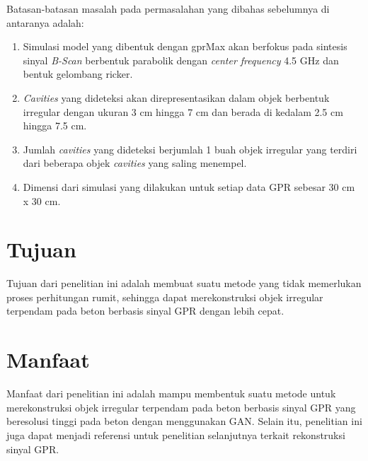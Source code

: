 Batasan-batasan masalah pada permasalahan yang dibahas sebelumnya di antaranya adalah:

\begin{enumerate}[nolistsep]

  \item Simulasi model yang dibentuk dengan gprMax akan berfokus pada sintesis sinyal \emph{B-Scan} berbentuk parabolik dengan \emph{center frequency} 4.5 GHz dan bentuk gelombang ricker.

  \item \emph{Cavities} yang dideteksi akan direpresentasikan dalam objek berbentuk irregular dengan ukuran 3 cm hingga 7 cm dan berada di kedalam 2.5 cm hingga 7.5 cm.
  
  \item Jumlah \emph{cavities} yang dideteksi berjumlah 1 buah objek irregular yang terdiri dari beberapa objek \emph{cavities} yang saling menempel.

  \item Dimensi dari simulasi yang dilakukan untuk setiap data GPR sebesar 30 cm x 30 cm.

\end{enumerate}

\section{Tujuan}
\label{sec:Tujuan}

Tujuan dari penelitian ini adalah membuat suatu metode yang tidak memerlukan proses perhitungan rumit, sehingga dapat merekonstruksi objek irregular terpendam pada beton berbasis sinyal GPR dengan lebih cepat.

\section{Manfaat}
\label{sec:manfaat}

Manfaat dari penelitian ini adalah mampu membentuk suatu metode untuk merekonstruksi objek irregular terpendam pada beton berbasis sinyal GPR yang beresolusi tinggi pada beton dengan menggunakan GAN. 
Selain itu, penelitian ini juga dapat menjadi referensi untuk penelitian selanjutnya terkait rekonstruksi sinyal GPR.